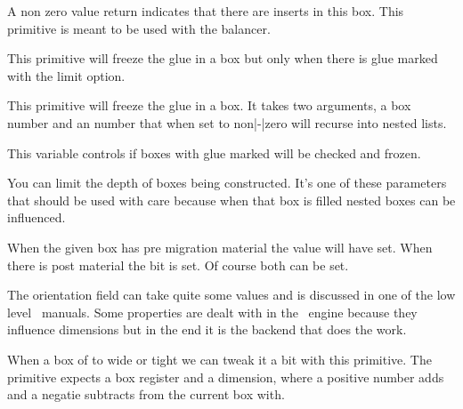 A non zero value return indicates that there are inserts in this box. This
primitive is meant to be used with the balancer.

\stopnewprimitive

\startnewprimitive[title={\prm {boxlimit}}]

This primitive will freeze the glue in a box but only when there is glue marked
with the limit option.

\stopnewprimitive

\startnewprimitive[title={\prm {boxlimitate}}]

This primitive will freeze the glue in a box. It takes two arguments, a box
number and an number that when set to non|-|zero will recurse into nested lists.

\stopnewprimitive

\startnewprimitive[title={\prm {boxlimitmode}}]

This variable controls if boxes with glue marked  will be checked
and frozen.

\stopnewprimitive

\startoldprimitive[title={\prm {boxmaxdepth}}]

You can limit the depth of boxes being constructed. It's one of these parameters
that should be used with care because when that box is filled nested boxes can be
influenced.

\stopoldprimitive

\startnewprimitive[title={\prm {boxmigrate}}]

When the given box has pre migration material the value will have 
set. When there is post material the  bit is set. Of course both can
be set.

\stopnewprimitive

\startnewprimitive[title={\prm {boxorientation}}]

The orientation field can take quite some values and is discussed in one of the low level
\CONTEXT\ manuals. Some properties are dealt with in the \TEX\ engine because they
influence dimensions but in the end it is the backend that does the work.

\stopnewprimitive

\startnewprimitive[title={\prm {boxrepack}}]

When a box of to wide or tight we can tweak it a bit with this primitive. The
primitive expects a box register and a dimension, where a positive number adds
and a negatie subtracts from the current box with.


